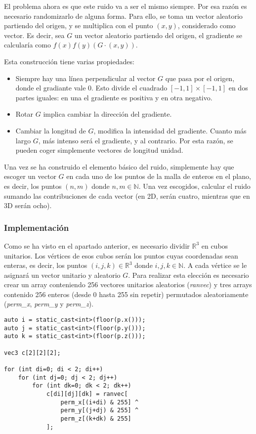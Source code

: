 
El problema ahora es que este ruido va a ser el mismo siempre. Por esa razón es necesario randomizarlo de alguna forma. Para ello, se toma un vector aleatorio partiendo del origen, y se multiplica con el punto $(x,y)$, considerado como vector. Es decir, sea $G$ un vector aleatorio partiendo del origen, el gradiente se calcularía como $f(x)f(y)(G\cdot(x,y))$.

Esta construcción tiene varias propiedades:
\begin{itemize}
\item Siempre hay una línea perpendicular al vector $G$ que pasa por el origen, donde el gradiante vale 0. Esto divide el cuadrado $[-1,1]\times[-1,1]$ en dos partes iguales: en una el gradiente es positiva y en otra negativo.
\item Rotar $G$ implica cambiar la dirección del gradiente.
\item Cambiar la longitud de $G$, modifica la intensidad del gradiente. Cuanto más largo $G$, más intenso será el gradiente, y al contrario. Por esta razón, se pueden coger simplemente vectores de longitud unidad.
\end{itemize}

Una vez se ha construido el elemento básico del ruido, simplemente hay que escoger un vector $G$ en cada uno de los puntos de la malla de enteros en el plano, es decir, los puntos $(n,m)$ donde $n,m\in\mathbb{N}$. Una vez escogidos, calcular el ruido sumando las contribuciones de cada vector (en 2D, serán cuatro, mientras que en 3D serán ocho).

\subsubsection{Implementación}

Como se ha visto en el apartado anterior, es necesario dividir $\mathbb{R}^3$ en cubos unitarios. Los vértices de esos cubos serán los puntos cuyas coordenadas sean enteras, es decir, los puntos $(i,j,k)\in\mathbb{R}^3$ donde $i,j,k\in\mathbb{N}$. A cada vértice se le asignará un vector unitario y aleatorio $G$. Para realizar esta elección es necesario crear un array conteniendo 256 vectores unitarios aleatorios (\textit{ranvec}) y tres arrays contenido 256 enteros (desde 0 hasta 255 sin repetir) permutados aleatoriamente  (\textit{perm\_x}, \textit{perm\_y} y \textit{perm\_z}).

\begin{lstlisting}[]
auto i = static_cast<int>(floor(p.x()));
auto j = static_cast<int>(floor(p.y()));
auto k = static_cast<int>(floor(p.z()));

vec3 c[2][2][2];

for (int di=0; di < 2; di++)
    for (int dj=0; dj < 2; dj++)
        for (int dk=0; dk < 2; dk++)
            c[di][dj][dk] = ranvec[
                perm_x[(i+di) & 255] ^
                perm_y[(j+dj) & 255] ^
                perm_z[(k+dk) & 255]
            ];
\end{lstlisting}

